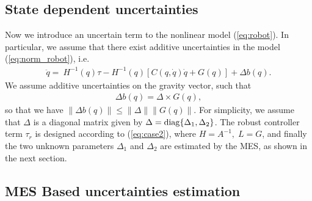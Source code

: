 \documentclass[twoside,leqno,onecolumn]{article}
\begin{document}
\subsection{State dependent uncertainties}
Now we introduce an uncertain term to the nonlinear model
(\ref{eq:robot}). In particular, we assume that there exist
additive uncertainties in the model (\ref{eq:norm_robot}), i.e.
\begin{align}
\label{eq:uncertain_robot} \ddot{q}=~H^{-1}(q) \tau -  H^{-1}(q)
\left[C(q,\dot{q})\dot{q}+ G(q)\right] + \Delta b(q).
\end{align}
We assume additive uncertainties on the gravity vector, such that
\begin{align}
\label{eq:robot_case2} \Delta b(q) =  \Delta \times G(q),
\end{align}
so that we have $\|\Delta b(q)\| \leq \|\Delta\|\|G(q)\|$.  For
simplicity, we assume that $\Delta$ is a diagonal matrix given by
$\Delta  ={\rm diag}\{\Delta_1, \Delta_2\}$. The robust controller
term $\tau_{r}$ is designed according to (\ref{eq:case2}), where
$H=A^{-1},\;L=G$, and finally the two unknown parameters
$\Delta_1$ and $\Delta_2$ are estimated by the MES, as shown in
the next section.

\subsection{MES Based uncertainties estimation}
\label{sec:constant}
\end{document}
